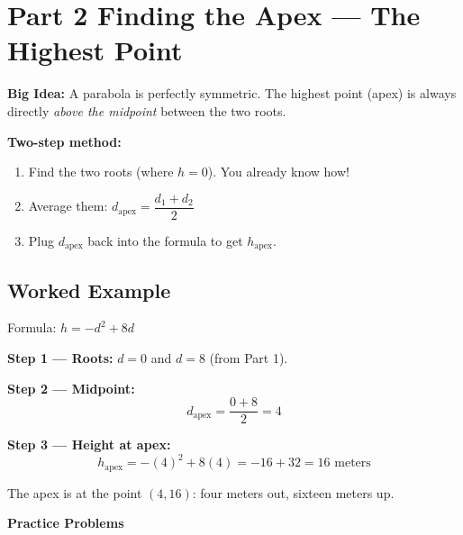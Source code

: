 \documentclass[12pt]{article}
\begin{document}
\newpage

\section*{Part 2 \quad Finding the Apex --- The Highest Point}

\begin{conceptbox}
\textbf{Big Idea:} A parabola is perfectly symmetric.  The highest point
(apex) is always directly \emph{above the midpoint} between the two roots.

\medskip
\textbf{Two-step method:}
\begin{enumerate}[nosep]
  \item Find the two roots (where $h = 0$).  You already know how!
  \item Average them: \quad
        $d_{\text{apex}} = \dfrac{d_1 + d_2}{2}$
  \item Plug $d_{\text{apex}}$ back into the formula to get
        $h_{\text{apex}}$.
\end{enumerate}
\end{conceptbox}

\subsection*{Worked Example}

Formula: $h = -d^2 + 8d$

\textbf{Step 1 --- Roots:} $d = 0$ and $d = 8$ (from Part 1).

\textbf{Step 2 --- Midpoint:}
\[
  d_{\text{apex}} = \frac{0 + 8}{2} = 4
\]

\textbf{Step 3 --- Height at apex:}
\[
  h_{\text{apex}} = -(4)^2 + 8(4) = -16 + 32 = \boxed{16 \text{ meters}}
\]

The apex is at the point $(4, 16)$: four meters out, sixteen meters up.

\bigskip
\textbf{Practice Problems}
\end{document}
